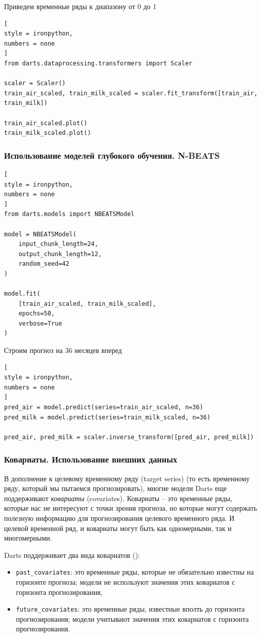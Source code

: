 \documentclass[%
	11pt,
	a4paper,
	utf8,
		]{article}
\begin{document}
Приведем временные ряды к диапазону от 0 до 1
\begin{lstlisting}[
style = ironpython,
numbers = none
]
from darts.dataprocessing.transformers import Scaler

scaler = Scaler()
train_air_scaled, train_milk_scaled = scaler.fit_transform([train_air, train_milk])

train_air_scaled.plot()
train_milk_scaled.plot()
\end{lstlisting}

\subsubsection{Использование моделей глубокого обучения. N-BEATS}

\begin{lstlisting}[
style = ironpython,
numbers = none
]
from darts.models import NBEATSModel

model = NBEATSModel(
    input_chunk_length=24,
    output_chunk_length=12,
    random_seed=42
)

model.fit(
    [train_air_scaled, train_milk_scaled],
    epochs=50,
    verbose=True
)
\end{lstlisting}

Строим прогноз на 36 месяцев вперед
\begin{lstlisting}[
style = ironpython,
numbers = none
]
pred_air = model.predict(series=train_air_scaled, n=36)
pred_milk = model.predict(series=train_milk_scaled, n=36)

pred_air, pred_milk = scaler.inverse_transform([pred_air, pred_milk])
\end{lstlisting}

\subsubsection{Ковариаты. Использование внешних данных}

В дополнение к целевому временному ряду (target series) (то есть временному ряду, который мы пытаемся прогнозировать), многие модели Darts еще поддерживают \emph{ковариаты} (covariates). Ковариаты -- это временные ряды, которые нас не интересуют с точки зрения прогноза, но которые могут содержать полезную информацию для прогнозирования целевого временного ряда. И целевой временной ряд, и ковариаты могут быть как одномерными, так и многомерными.

Darts поддерживает два вида ковариатов ():
\begin{itemize}
	\item \verb|past_covariates|: это временные ряды, которые не обязательно известны на горизонте прогноза; модели не используют значения этих ковариатов с горизонта прогнозирования,
	
	\item \verb|future_covariates|: это временные ряды, известные вполть до горизонта прогнозирования; модели учитывают значения этих ковариатов с горизонта прогнозирования.
\end{itemize}
\end{document}
